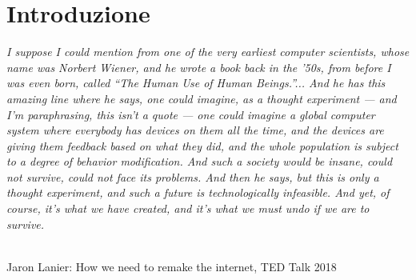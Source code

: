\section{Introduzione}
\label{sec:Introduzione}

\begin{center}

\vspace{0.5cm}

\textit{I suppose I could mention from one of the very earliest computer scientists,
whose name was Norbert Wiener, and he wrote a book back in the ’50s,
from before I was even born, called “The Human Use of Human Beings.”...
And he has this amazing line where he says, one could imagine, as a thought experiment
— and I’m paraphrasing, this isn’t a quote —
one could imagine a global computer system where everybody has devices on them all the time,
and the devices are giving them feedback based on what they did,
and the whole population is subject to a degree of behavior modification.
And such a society would be insane, could not survive, could not face its problems.
And then he says, but this is only a thought experiment,
and such a future is technologically infeasible.
And yet, of course, it’s what we have created,
and it’s what we must undo if we are to survive.}

\\

Jaron Lanier: How we need to remake the internet, TED Talk 2018

\vspace{0.5cm}

\end{center}

